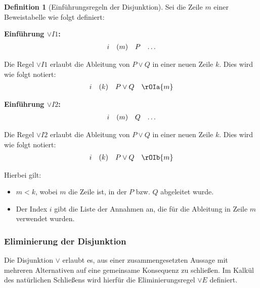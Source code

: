 \documentclass{book}
\theoremstyle{plain}
\theoremstyle{remark}
\theoremstyle{definition}
\newtheorem{definition}{Definition}[section]
\begin{document}
\begin{definition}[Einführungsregeln der Disjunktion]
Sei die Zeile \(m\) einer Beweistabelle wie folgt definiert:

\textbf{Einführung \(\lor I1\):}
\[
\begin{array}{l l l l}
    i & (m) & P & \dots \\
\end{array}
\]

Die Regel \(\lor I1\) erlaubt die Ableitung von \(P \lor Q\) in einer neuen Zeile \(k\). Dies wird wie folgt notiert:
\[
\begin{array}{l l l l}
    i & (k) & P \lor Q & \rOIa{m} \\
\end{array}
\]

\textbf{Einführung \(\lor I2\):}
\[
\begin{array}{l l l l}
    i & (m) & Q & \dots \\
\end{array}
\]

Die Regel \(\lor I2\) erlaubt die Ableitung von \(P \lor Q\) in einer neuen Zeile \(k\). Dies wird wie folgt notiert:
\[
\begin{array}{l l l l}
    i & (k) & P \lor Q & \rOIb{m} \\
\end{array}
\]

Hierbei gilt:
\begin{itemize}
    \item \(m < k\), wobei \(m\) die Zeile ist, in der \(P\) bzw. \(Q\) abgeleitet wurde.
    \item Der Index \(i\) gibt die Liste der Annahmen an, die für die Ableitung in Zeile \(m\) verwendet wurden.
\end{itemize}

\end{definition}

\subsubsection{Eliminierung der Disjunktion}
\label{rule:OE}
Die Disjunktion \(\lor\) erlaubt es, aus einer zusammengesetzten Aussage mit mehreren Alternativen auf eine gemeinsame Konsequenz zu schließen. Im Kalkül des natürlichen Schließens wird hierfür die Eliminierungsregel \(\lor E\) definiert.
\end{document}
